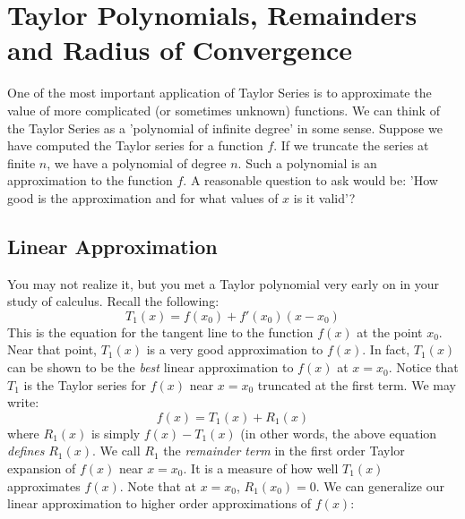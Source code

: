 \documentclass[12pt,a4paper]{article} %
\begin{document}
\section{Taylor Polynomials, Remainders and Radius of Convergence}
One of the most important application of Taylor Series is to approximate the value of more complicated (or sometimes unknown) functions.  We can think of the Taylor Series as a 'polynomial of infinite degree' in some sense.  Suppose we have computed the Taylor series for a function $f$.  If we truncate the series at finite $n$, we have a polynomial of degree $n$. Such a polynomial is an approximation to the function $f$.  A reasonable question to ask would be: 'How good is the approximation and for what values of $x$ is it valid'?

\subsection{Linear Approximation}
You may not realize it, but you met a Taylor polynomial very early on in your study of calculus.  Recall the following:
\begin{equation}
T_1(x) = f(x_0) + f'(x_0)(x-x_0)
\end{equation}
This is the equation for the tangent line to the function $f(x)$ at the point $x_0$.  Near that point, $T_1(x)$ is a very good approximation to $f(x)$.  In fact, $T_1(x)$ can be shown to be the \emph{best} linear approximation to $f(x)$ at $x=x_0$.  Notice that $T_1$ is the Taylor series for $f(x)$ near $x=x_0$ truncated at the first term.  We may write:
\begin{equation}
f(x) = T_1(x) + R_1(x)
\end{equation}
where $R_1(x)$ is simply $f(x) - T_1(x)$ (in other words, the above equation \emph{defines} $R_1(x)$.  We call $R_1$ the \emph{remainder term} in the first order Taylor expansion of $f(x)$ near $x=x_0$.  It is a measure of how well $T_1(x)$ approximates $f(x)$.  Note that at $x=x_0$, $R_1(x_0) = 0$.  We can generalize our linear approximation to higher order approximations of $f(x)$:
\end{document}
